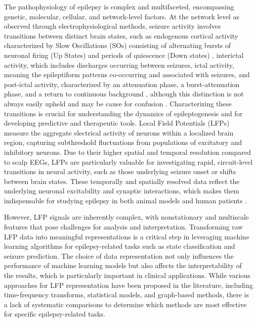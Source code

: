 \documentclass{article}
\begin{document}
The pathophysiology of epilepsy is complex and multifaceted, encompassing genetic, molecular, cellular, and network-level factors. At the network level as observed through electrophysiological methods, seizure activity involves transitions between distinct brain states, such as endogenous cortical activity characterized by Slow Oscillations (SOs) consisting of alternating bursts of neuronal firing (Up States) and periods of quiescence (Down states) \cite{jercog2017}, interictal activity, which includes discharges occurring between seizures, ictal activity, meaning the epileptiform patterns co-occurring and associated with seizures, and post-ictal activity, characterized by an attenuation phase, a burst-attenuation phase, and a return to continuous background \cite{bateman2019}, although this distinction is not always easily upheld and may be cause for confusion \cite{fisher2014,fisher2010}. Characterizing these transitions is crucial for understanding the dynamics of epileptogenesis and for developing predictive and therapeutic tools. Local Field Potentials (LFPs) measure the aggregate electrical activity of neurons within a localized brain region, capturing subthreshold fluctuations from populations of excitatory and inhibitory neurons. Due to their higher spatial and temporal resolution compared to scalp EEGs, LFPs are particularly valuable for investigating rapid, circuit-level transitions in neural activity, such as those underlying seizure onset or shifts between brain states. These temporally and spatially resolved data reflect the underlying neuronal excitability and synaptic interactions, which makes them indispensable for studying epilepsy in both animal models and human patients \cite{buzsaki2012}.

However, LFP signals are inherently complex, with nonstationary and multiscale features that pose challenges for analysis and interpretation. Transforming raw LFP data into meaningful representations is a critical step in leveraging machine learning algorithms for epilepsy-related tasks such as state classification and seizure prediction. The choice of data representation not only influences the performance of machine learning models but also affects the interpretability of the results, which is particularly important in clinical applications. While various approaches for LFP representation have been proposed in the literature, including time-frequency transforms, statistical models, and graph-based methods, there is a lack of systematic comparisons to determine which methods are most effective for specific epilepsy-related tasks.
\end{document}
